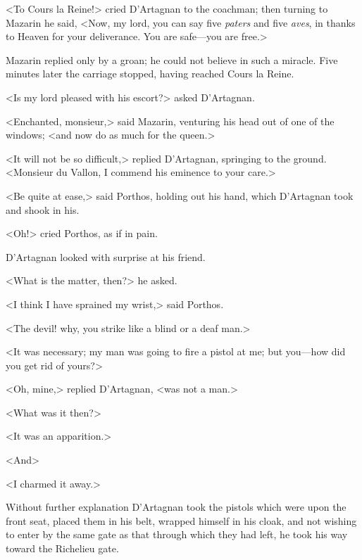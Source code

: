 <To Cours la Reine!> cried D'Artagnan to the coachman; then turning to Mazarin he said, <Now, my lord, you can say five \textit{paters} and five \textit{aves}, in thanks to Heaven for your deliverance. You are safe—you are free.>

Mazarin replied only by a groan; he could not believe in such a miracle. Five minutes later the carriage stopped, having reached Cours la Reine.

<Is my lord pleased with his escort?> asked D'Artagnan.

<Enchanted, monsieur,> said Mazarin, venturing his head out of one of the windows; <and now do as much for the queen.>

<It will not be so difficult,> replied D'Artagnan, springing to the ground. <Monsieur du Vallon, I commend his eminence to your care.>

<Be quite at ease,> said Porthos, holding out his hand, which D'Artagnan took and shook in his.

<Oh!> cried Porthos, as if in pain.

D'Artagnan looked with surprise at his friend.

<What is the matter, then?> he asked.

<I think I have sprained my wrist,> said Porthos.

<The devil! why, you strike like a blind or a deaf man.>

<It was necessary; my man was going to fire a pistol at me; but you—how did you get rid of yours?>

<Oh, mine,> replied D'Artagnan, <was not a man.>

<What was it then?>

<It was an apparition.>

<And\longdash>

<I charmed it away.>

Without further explanation D'Artagnan took the pistols which were upon the front seat, placed them in his belt, wrapped himself in his cloak, and not wishing to enter by the same gate as that through which they had left, he took his way toward the Richelieu gate. 